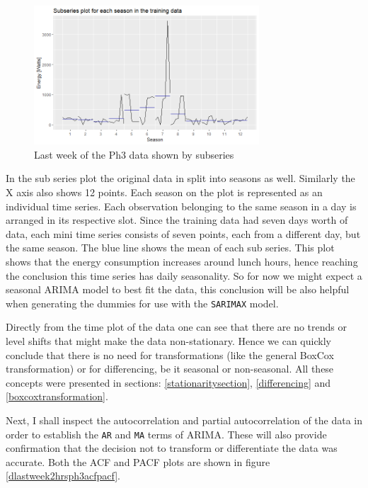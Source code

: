 \documentclass[12pt,a4paper,titlepage]{report}
\begin{document}
\begin{figure}[h]
    \centering
    \includegraphics[width=0.75\textwidth]{dlastweek2hrsph3subseries}
    \caption{Last week of the Ph3 data shown by subseries}
    \label{dlastweek2hrsph3subseries}
\end{figure}

In the sub series plot the original data in split into seasons as well. Similarly the X axis also shows 12 points.
Each season on the plot is represented as an individual time series. Each observation belonging to the same season in a day is arranged in its respective slot. Since the training data had seven days worth of data, each mini time series consists of seven points, each from a different day, but the same season. The blue line shows the mean of each sub series. This plot shows that the energy consumption increases around lunch hours, hence reaching the conclusion this time series has daily seasonality.
So for now we might expect a seasonal ARIMA model to best fit the data, this conclusion will be also helpful when generating the dummies for use with the \texttt{SARIMAX} model.

Directly from the time plot of the data one can see that there are no trends or level shifts that might make the data non-stationary. Hence we can quickly conclude that there is no need for transformations (like the general BoxCox transformation) or for differencing, be it seasonal or non-seasonal. All these concepts were presented in sections: \ref{stationaritysection}, \ref{differencing} and \ref{boxcoxtransformation}.

Next, I shall inspect the autocorrelation and partial autocorrelation of the data in order to establish the \texttt{AR} and \texttt{MA} terms of ARIMA. These will also provide confirmation that the decision not to transform or differentiate the data was accurate. Both the ACF and PACF plots are shown in figure \ref{dlastweek2hrsph3acfpacf}.
\end{document}
